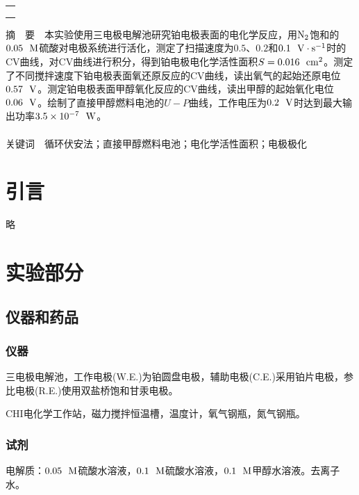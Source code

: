 \documentclass[12pt]{article}
\begin{document}
\begin{titlepage}
\begin{center}
            \begin{tabular*}{\textwidth}{c}
                \\ %
                \\ %
                \\ %
                \\ %
                \hline %
            \end{tabular*}
        \end{center}
        \textsf{摘\ \ 要}\ \ 本实验使用三电极电解池研究铂电极表面的电化学反应，用${\rm N_{2}}$饱和的${\rm 0.05 \ \ M}$硫酸对电极系统进行活化，测定了扫描速度为$0.5$、$0.2$和$0.1\ \ {\rm V\cdot s^{-1}}$时的CV曲线，对CV曲线进行积分，得到铂电极电化学活性面积$S=0.016\ \ {\rm cm^{2}}$。测定了不同搅拌速度下铂电极表面氧还原反应的CV曲线，读出氧气的起始还原电位$0.57\ \ {\rm V}$。测定铂电极表面甲醇氧化反应的CV曲线，读出甲醇的起始氧化电位$0.06\ \ {\rm V}$。绘制了直接甲醇燃料电池的$U-P$曲线，工作电压为$0.2\ \ {\rm V}$时达到最大输出功率$3.5\times 10^{-7}\ \ {\rm W}$。
        \\
        \\
        \textsf{关键词}\ \ 循环伏安法；直接甲醇燃料电池；电化学活性面积；电极极化
    \end{titlepage}

    \section{引言}
	略
               
\vbox{}        
    \section{实验部分}
    	\subsection{仪器和药品}
    	\subsubsection{仪器}
    	三电极电解池，工作电极(W.E.)为铂圆盘电极，辅助电极(C.E.)采用铂片电极，参比电极(R.E.)使用双盐桥饱和甘汞电极。\par 
    	CHI电化学工作站，磁力搅拌恒温槽，温度计，氧气钢瓶，氮气钢瓶。
    	\subsubsection{试剂}
    	电解质：$0.05\ \ {\rm M}$硫酸水溶液，$0.1\ \ {\rm M}$硫酸水溶液，$0.1\ \ {\rm M}$甲醇水溶液。去离子水。
\vbox{}
\end{document}
